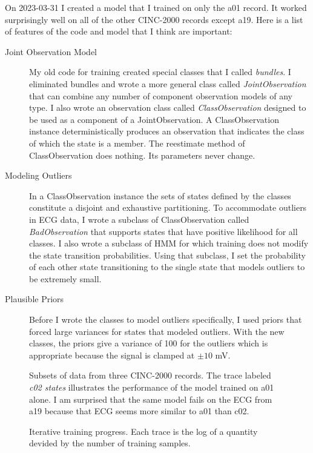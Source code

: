 \documentclass[12pt]{article}
\begin{document}
On 2023-03-31 I created a model that I trained on only the a01 record.
It worked surprisingly well on all of the other CINC-2000 records
except a19.  Here is a list of features of the code and model that I
think are important:
\begin{description}
\item[Joint Observation Model] My old code for training created
  special classes that I called \emph{bundles}.  I eliminated bundles
  and wrote a more general class called \emph{JointObservation} that
  can combine any number of component observation models of any type.
  I also wrote an observation class called \emph{ClassObservation}
  designed to be used as a component of a JointObservation.  A
  ClassObservation instance deterministically produces an observation
  that indicates the class of which the state is a member.  The
  reestimate method of ClassObservation does nothing.  Its parameters
  never change.
\item[Modeling Outliers] In a ClassObservation instance the sets of
  states defined by the classes constitute a disjoint and exhaustive
  partitioning.  To accommodate outliers in ECG data, I wrote a
  subclass of ClassObservation called \emph{BadObservation} that
  supports states that have positive likelihood for all classes.  I
  also wrote a subclass of HMM for which training does not modify the
  state transition probabilities.  Using that subclass, I set the
  probability of each other state transitioning to the single state
  that models outliers to be extremely small.
\item[Plausible Priors] Before I wrote the classes to model outliers
  specifically, I used priors that forced large variances for states
  that modeled outliers.  With the new classes, the priors give a
  variance of 100 for the outliers which is appropriate because the
  signal is clamped at $\pm 10$ mV.
\end{description}

\begin{figure}
  \centering
  \caption{Subsets of data from three CINC-2000 records.  The trace
    labeled \emph{c02 states} illustrates the performance of the model
    trained on a01 alone.  I am surprised that the same model fails on
    the ECG from a19 because that ECG seems more similar to a01 than
    c02.}
  \label{fig:a01a19c02}
\end{figure}

\begin{figure}
  \centering
  \caption{Iterative training progress.  Each trace is the log of a
    quantity devided by the number of training samples.}
  \label{fig:train_log.pdf}
\end{figure}
\end{document}
